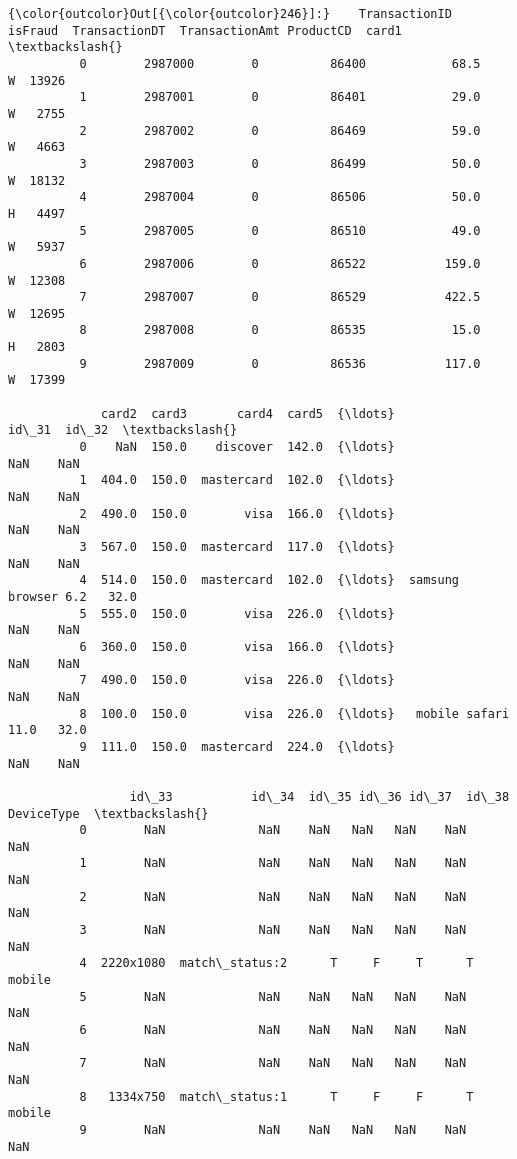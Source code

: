 \documentclass[11pt]{article}
\begin{document}
\begin{Verbatim}[commandchars=\\\{\}]
{\color{outcolor}Out[{\color{outcolor}246}]:}    TransactionID  isFraud  TransactionDT  TransactionAmt ProductCD  card1  \textbackslash{}
          0        2987000        0          86400            68.5         W  13926   
          1        2987001        0          86401            29.0         W   2755   
          2        2987002        0          86469            59.0         W   4663   
          3        2987003        0          86499            50.0         W  18132   
          4        2987004        0          86506            50.0         H   4497   
          5        2987005        0          86510            49.0         W   5937   
          6        2987006        0          86522           159.0         W  12308   
          7        2987007        0          86529           422.5         W  12695   
          8        2987008        0          86535            15.0         H   2803   
          9        2987009        0          86536           117.0         W  17399   
          
             card2  card3       card4  card5  {\ldots}                id\_31  id\_32  \textbackslash{}
          0    NaN  150.0    discover  142.0  {\ldots}                  NaN    NaN   
          1  404.0  150.0  mastercard  102.0  {\ldots}                  NaN    NaN   
          2  490.0  150.0        visa  166.0  {\ldots}                  NaN    NaN   
          3  567.0  150.0  mastercard  117.0  {\ldots}                  NaN    NaN   
          4  514.0  150.0  mastercard  102.0  {\ldots}  samsung browser 6.2   32.0   
          5  555.0  150.0        visa  226.0  {\ldots}                  NaN    NaN   
          6  360.0  150.0        visa  166.0  {\ldots}                  NaN    NaN   
          7  490.0  150.0        visa  226.0  {\ldots}                  NaN    NaN   
          8  100.0  150.0        visa  226.0  {\ldots}   mobile safari 11.0   32.0   
          9  111.0  150.0  mastercard  224.0  {\ldots}                  NaN    NaN   
          
                 id\_33           id\_34  id\_35 id\_36 id\_37  id\_38  DeviceType  \textbackslash{}
          0        NaN             NaN    NaN   NaN   NaN    NaN         NaN   
          1        NaN             NaN    NaN   NaN   NaN    NaN         NaN   
          2        NaN             NaN    NaN   NaN   NaN    NaN         NaN   
          3        NaN             NaN    NaN   NaN   NaN    NaN         NaN   
          4  2220x1080  match\_status:2      T     F     T      T      mobile   
          5        NaN             NaN    NaN   NaN   NaN    NaN         NaN   
          6        NaN             NaN    NaN   NaN   NaN    NaN         NaN   
          7        NaN             NaN    NaN   NaN   NaN    NaN         NaN   
          8   1334x750  match\_status:1      T     F     F      T      mobile   
          9        NaN             NaN    NaN   NaN   NaN    NaN         NaN   
          

\end{Verbatim}
\end{document}
